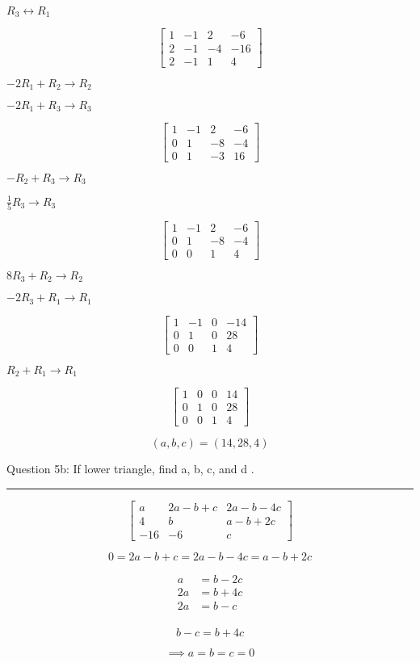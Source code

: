 \documentclass[a4paper,11pt,twoside]{report}
\begin{document}
$R_3 \leftrightarrow R_1$

\[\begin{bmatrix} 1 & -1 & 2 & -6 \\ 2 & -1 & -4 & -16 \\ 2 & -1 & 1 & 4 \end{bmatrix} \]

$-2R_1 + R_2 \to R_2$

$-2R_1 + R_3 \to R_3$

\[\begin{bmatrix} 1 & -1 & 2 & -6 \\ 0 & 1 & -8 & -4 \\ 0 & 1 & -3 & 16 \end{bmatrix} \]

$-R_2 + R_3 \to R_3$

$\frac{1}{5}R_3 \to R_3$

\[\begin{bmatrix} 1 & -1 & 2 & -6 \\ 0 & 1 & -8 & -4 \\ 0 & 0 & 1 & 4 \end{bmatrix} \]

$8R_3 + R_2 \to R_2$

$-2R_3 + R_1 \to R_1$

\[\begin{bmatrix} 1 & -1 & 0 & -14 \\ 0 & 1 & 0 & 28 \\ 0 & 0 & 1 & 4 \end{bmatrix} \]

$R_2 + R_1 \to R_1$

\[\begin{bmatrix} 1 & 0 & 0 & 14 \\ 0 & 1 & 0 & 28 \\ 0 & 0 & 1 & 4 \end{bmatrix} \]

\[\boxed{(a,b,c) = (14,28,4)}\]


\noindent Question 5b: If lower triangle, find a, b, c, and d . \\ \hrule

\[\begin{bmatrix} a & 2a-b+c & 2a -b -4c \\ 4 & b & a-b+2c \\ -16 & -6 & c \end{bmatrix} \]

\[0 = 2a - b + c = 2a - b -4c = a - b + 2c\]

\begin{align*}
	a &=  b - 2c\\
	2a &=  b + 4c \\
	2a &= b -c \\
\end{align*}

\[b-c = b + 4c\]

\[\implies \boxed{a = b = c = 0}\]





\newpage
\end{document}
